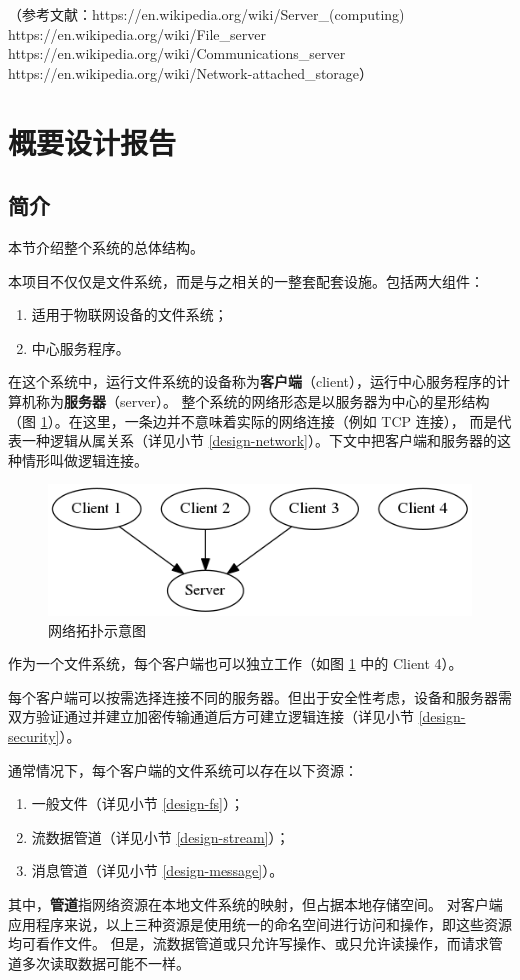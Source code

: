 \documentclass{ctexart}
\begin{document}
（参考文献：https://en.wikipedia.org/wiki/Server\_(computing)\\
 https://en.wikipedia.org/wiki/File\_server\\ https://en.wikipedia.org/wiki/Communications\_server\\ https://en.wikipedia.org/wiki/Network-attached\_storage）

\section{概要设计报告}

\subsection{简介}
本节介绍整个系统的总体结构。

本项目不仅仅是文件系统，而是与之相关的一整套配套设施。包括两大组件：
\begin{enumerate}
	\item 适用于物联网设备的文件系统；
	\item 中心服务程序。
\end{enumerate}
在这个系统中，运行文件系统的设备称为\textbf{客户端}（client），运行中心服务程序的计算机称为\textbf{服务器}（server）。
整个系统的网络形态是以服务器为中心的星形结构（图 \ref{design-net-topo}）。在这里，一条边并不意味着实际的网络连接（例如 TCP 连接），
而是代表一种逻辑从属关系（详见小节 \ref{design-network}）。下文中把客户端和服务器的这种情形叫做逻辑连接。

\begin{figure}
	\includegraphics[width=\textwidth]{design-net-topo.png}
	\caption{网络拓扑示意图}
	\label{design-net-topo}
\end{figure}

作为一个文件系统，每个客户端也可以独立工作（如图 \ref{design-net-topo} 中的 Client 4）。

每个客户端可以按需选择连接不同的服务器。但出于安全性考虑，设备和服务器需双方验证通过并建立加密传输通道后方可建立逻辑连接（详见小节 \ref{design-security}）。

通常情况下，每个客户端的文件系统可以存在以下资源：
\begin{enumerate}
	\item 一般文件（详见小节 \ref{design-fs}）；
	\item 流数据管道（详见小节 \ref{design-stream}）；
	\item 消息管道（详见小节 \ref{design-message}）。
\end{enumerate}
其中，\textbf{管道}指网络资源在本地文件系统的映射，但占据本地存储空间。
对客户端应用程序来说，以上三种资源是使用统一的命名空间进行访问和操作，即这些资源均可看作文件。
但是，流数据管道或只允许写操作、或只允许读操作，而请求管道多次读取数据可能不一样。
\end{document}
